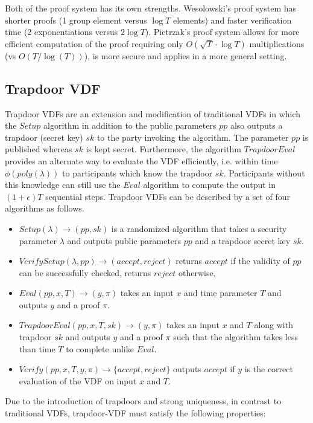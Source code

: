 \documentclass[letterpaper,twocolumn,10pt]{article}
\theoremstyle{definition}
\theoremstyle{remark}
\begin{document}
Both of the proof system has its own strengths. Wesolowski's proof system has shorter proofs (1 group element versus $\log T$ elements) and faster verification time (2 exponentiations versus $2 \log T$). Pietrzak's proof system allows for more efficient computation of the proof requiring only $O(\sqrt{T} \cdot \log T)$ multiplications (vs $O(T/\log (T))$), is more secure and applies in a more general setting.

\subsection{Trapdoor VDF}
\label{appendix:tvdf}
Trapdoor VDFs \cite{wesolowski2019efficient, schindler2021randrunner} are an extension and modification of traditional VDFs in which the $Setup$ algorithm in addition to the public parameters $pp$ also outputs a trapdoor (secret key) $sk$ to the party invoking the algorithm.  The parameter $pp$ is published whereas $sk$ is kept secret. Furthermore, the algorithm $TrapdoorEval$ provides an alternate way to evaluate the VDF efficiently, i.e. within time $\phi{(poly{(\lambda)})}$ to participants which know the trapdoor $sk$. Participants without this knowledge can still use the $Eval$ algorithm to compute the output in $(1+\epsilon)T$ sequential steps.
Trapdoor VDFs can be described by a set of four algorithms as follows.
\begin{itemize}
    \item $Setup(\lambda) \rightarrow (pp, sk)$ is a randomized algorithm that takes a security parameter $\lambda$ and outputs public parameters $pp$ and a trapdoor secret key $sk$.
    \item $VerifySetup(\lambda, pp) \rightarrow (accept, reject)$ returns $accept$ if the validity of $pp$ can be successfully checked, returns $reject$ otherwise.
    \item $Eval(pp, x, T) \rightarrow (y, \pi)$ takes an input $x$ and time parameter $T$ and outputs $y$ and a proof $\pi$.
    \item $TrapdoorEval(pp,x,T,sk) \rightarrow (y, \pi)$ takes an input $x$ and $T$ along with trapdoor $sk$ and outputs $y$ and a proof $\pi$ such that the algorithm takes less than time $T$ to complete unlike $Eval$.
    \item $Verify(pp, x, T, y, \pi) \rightarrow \{accept, reject\}$ outputs $accept$ if $y$ is the correct evaluation of the VDF on input $x$ and $T$.
\end{itemize}

Due to the introduction of trapdoors and strong uniqueness, in contrast to traditional VDFs, trapdoor-VDF must satisfy the following properties:
\end{document}
